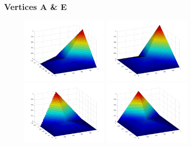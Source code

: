 \documentclass[]{beamer}
\begin{document}
\begin{frame}[t]\frametitle{Vertices A \& E}
    \begin{figure}[t]
		\centering
		\includegraphics[width=0.38\textwidth]{matlab/pentagon_plot_2_3.png} \hfill
		\includegraphics[width=0.38\textwidth]{matlab/d_pentagon_plot_1_3.png} \\ 
		\includegraphics[width=0.38\textwidth]{matlab/pentagon_plot_2_4.png} \hfill
		\includegraphics[width=0.38\textwidth]{matlab/d_pentagon_plot_1_4.png}
	\end{figure}
\end{frame}
\end{document}
